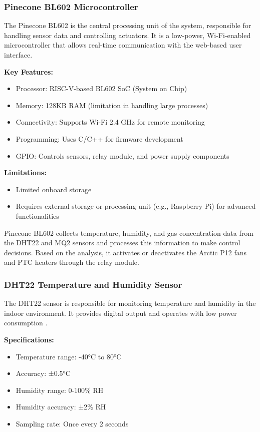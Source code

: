 \documentclass[a4paper]{scrartcl}
\begin{document}
\subsubsection{Pinecone BL602 Microcontroller}
The Pinecone BL602 is the central processing unit of the system, responsible for handling sensor data and controlling actuators. It is a low-power, Wi-Fi-enabled microcontroller that allows real-time communication with the web-based user interface.

\textbf{Key Features:}
\begin{itemize}
    \item Processor: RISC-V-based BL602 SoC (System on Chip)
    \item Memory: 128KB RAM (limitation in handling large processes)
    \item Connectivity: Supports Wi-Fi 2.4 GHz for remote monitoring
    \item Programming: Uses C/C++ for firmware development
    \item GPIO: Controls sensors, relay module, and power supply components
\end{itemize}

\textbf{Limitations:}
\begin{itemize}
    \item Limited onboard storage
    \item Requires external storage or processing unit (e.g., Raspberry Pi) for advanced functionalities \cite{r15}
\end{itemize}

Pinecone BL602 collects temperature, humidity, and gas concentration data from the DHT22 and MQ2 sensors and processes this information to make control decisions. Based on the analysis, it activates or deactivates the Arctic P12 fans and PTC heaters through the relay module.

\subsubsection{DHT22 Temperature and Humidity Sensor}
The DHT22 sensor is responsible for monitoring temperature and humidity in the indoor environment. It provides digital output and operates with low power consumption \cite{r1}.

\textbf{Specifications:}
\begin{itemize}
    \item Temperature range: -40°C to 80°C
    \item Accuracy: ±0.5°C
    \item Humidity range: 0-100\% RH
    \item Humidity accuracy: ±2\% RH
    \item Sampling rate: Once every 2 seconds
\end{itemize}
\end{document}
